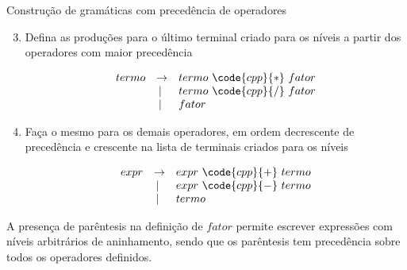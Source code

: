 \begin{frame}[fragile]{Construção de gramáticas com precedência de operadores}

    \begin{enumerate}
        \setcounter{enumi}{2}
        \item Defina as produções para o último terminal criado para os níveis a partir dos operadores com maior precedência
        \begin{footnotesize}
        \[
            \begin{array}{rcl}
                termo & \to & termo\ \code{cpp}{*}\ fator \\
                & |\ & termo\ \code{cpp}{/}\ fator \\
                & |\ & fator
            \end{array}
        \]
        \end{footnotesize}
       
        \item Faça o mesmo para os demais operadores, em ordem decrescente de precedência e crescente na lista de terminais criados para os níveis
        \begin{footnotesize}
        \[
            \begin{array}{rcl}
                expr & \to & expr\ \code{cpp}{+}\ termo \\
                & |\ & expr\ \code{cpp}{-}\ termo \\
                & |\ & termo
            \end{array}
        \]
        \end{footnotesize}
    \end{enumerate}

    \vspace{0.1in}

    A presença de parêntesis na definição de $fator$ permite escrever expressões com níveis arbitrários de aninhamento, sendo que os parêntesis tem precedência
    sobre todos os operadores definidos.
    
\end{frame}

